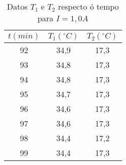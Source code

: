 \documentclass[12pt, a4paper, titlepage]{article}
\begin{document}
\begin{table}[H]
\begin{minipage}[c]{0,24\textwidth}
\begin{table}[H]
{\begin{tabular}{|c|c|c|}
        \hline
        $t (min)$ & $T_1 (^\circ C)$ & $T_2 (^\circ C)$ \\ \hline
        92  & 34,9 & 17,3 \\ \hline
        93  & 34,8 & 17,3 \\ \hline
        94  & 34,8 & 17,3 \\ \hline
        95  & 34,7 & 17,3 \\ \hline
        96  & 34,6 & 17,3 \\ \hline
        97  & 34,6 & 17,3 \\ \hline
        98  & 34,4 & 17,2 \\ \hline
        99  & 34,4 & 17,3 \\ \hline
        \end{tabular}}
        \end{table}
    \end{minipage}
    \begin{minipage}[c]{0,24\textwidth}
      \begin{table}[H]
        \end{table}
    \end{minipage}
    \caption{Datos $T_1$ e $T_2$ respecto ó tempo para $I = 1,0A$}
    \label{cad:t_i_10}
  \end{table}
\end{document}
